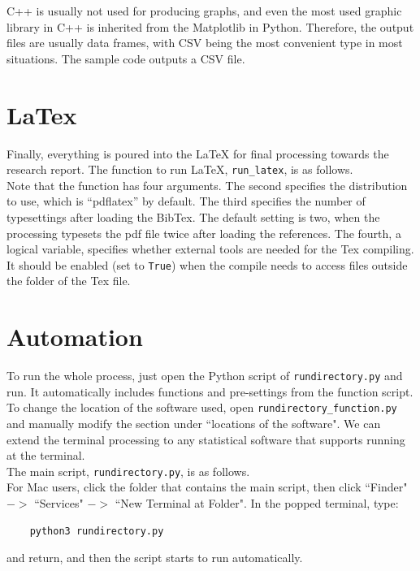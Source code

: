 \documentclass[12pt, a4paper]{article}
\begin{document}


C++ is usually not used for producing graphs, and even the most used graphic library in C++ is inherited from the Matplotlib in Python. Therefore, the output files are usually data frames, with CSV being the most convenient type in most situations. The sample code outputs a CSV file.\\

\section{LaTex}

Finally, everything is poured into the LaTeX for final processing towards the research report. The function to run LaTeX, \texttt{run\_latex}, is as follows.\\



Note that the function has four arguments. The second specifies the distribution to use, which is ``pdflatex'' by default. The third specifies the number of typesettings after loading the BibTex. The default setting is two, when the processing typesets the pdf file twice after loading the references. The fourth, a logical variable, specifies whether external tools are needed for the Tex compiling. It should be enabled (set to \texttt{True}) when the compile needs to access files outside the folder of the Tex file.\\

\section{Automation}

To run the whole process, just open the Python script of \texttt{rundirectory.py} and run. It automatically includes functions and pre-settings from the function script.\\

To change the location of the software used, open \texttt{rundirectory\_function.py} and manually modify the section under ``locations of the software". We can extend the terminal processing to any statistical software that supports running at the terminal.\\

The main script, \texttt{rundirectory.py}, is as follows.\\



For Mac users, click the folder that contains the main script, then click ``Finder" $->$ ``Services" $->$ ``New Terminal at Folder". In the popped terminal, type:
\begin{verbatim}
	python3 rundirectory.py
\end{verbatim}
and return, and then the script starts to run automatically.\\

\nocite{*}
\printbibliography
\end{document}
